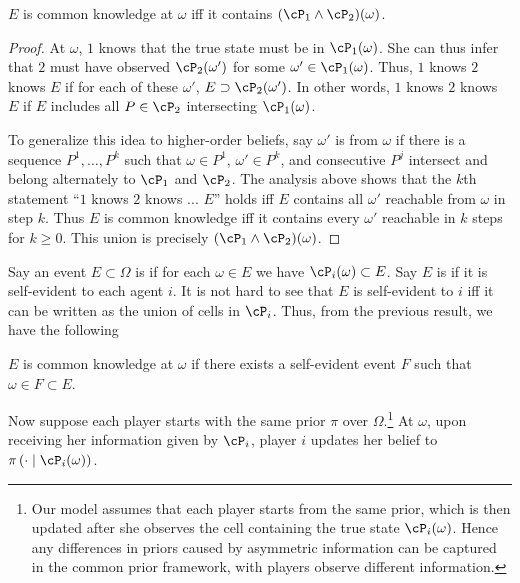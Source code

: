 \begin{proposition}
  \(E\) is common knowledge at \(\omega\) iff it contains \((\cP_1 \land \cP_2)(\omega)\).
\end{proposition}
\begin{proof}
  At \(\omega\), \(1\) knows that the true state must be in \(\cP_1(\omega)\).
  She can thus infer that \(2\) must have observed \(\cP_2(\omega')\) for some \(\omega' \in \cP_1(\omega)\).
  Thus, \(1\) knows \(2\) knows \(E\) if for each of these \(\omega'\), \(E \supset \cP_2(\omega')\).
  In other words, \(1\) knows \(2\) knows \(E\) if \(E\) includes all \(P \in \cP_2\) intersecting \(\cP_1(\omega)\).

  To generalize this idea to higher-order beliefs, say \(\omega'\) is  from \(\omega\) if there is a sequence \(P^1, \dots, P^k\) such that \(\omega \in P^1\), \(\omega' \in P^k\), and consecutive \(P^j\) intersect and belong alternately to \(\cP_1\) and \(\cP_2\).
  The analysis above shows that the \(k\)th statement ``\(1\) knows \(2\) knows ... \(E\)'' holds iff \(E\) contains all \(\omega'\) reachable from \(\omega\) in step \(k\).
  Thus \(E\) is common knowledge iff it contains every \(\omega'\) reachable in \(k\) steps for \(k \geq 0\).
  This union is precisely \((\cP_1 \land \cP_2)(\omega)\).
\end{proof}

Say an event \(E \subset \Omega\) is  if for each \(\omega \in E\) we have \(\cP_i(\omega) \subset E\).
Say \(E\) is  if it is self-evident to each agent \(i\).
It is not hard to see that \(E\) is self-evident to \(i\) iff it can be written as the union of cells in \(\cP_i\).
Thus, from the previous result, we have the following
\begin{corollary}
  \(E\) is common knowledge at \(\omega\) if there exists a self-evident event \(F\) such that \(\omega \in F \subset E\).
\end{corollary}


Now suppose each player starts with the same prior \(\pi\) over \(\Omega\).\footnote{
  Our model assumes that each player starts from the same prior, which is then updated after she observes the cell containing the true state \(\cP_i(\omega)\).
  Hence any differences in priors caused by asymmetric information can be captured in the common prior framework, with players observe different information.
}
At \(\omega\), upon receiving her information given by \(\cP_i\), player \(i\) updates her belief to \(\pi\left(\cdot \mid \cP_i(\omega)\right)\).

